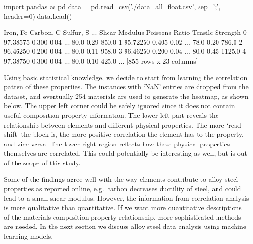 \documentclass[11pt]{article}
\newenvironment{Shaded}{}{}
\newcommand{\DecValTok}[1]{\textcolor[rgb]{0.25,0.63,0.44}{{#1}}}
\newcommand{\FloatTok}[1]{\textcolor[rgb]{0.25,0.63,0.44}{{#1}}}
\newcommand{\StringTok}[1]{\textcolor[rgb]{0.25,0.44,0.63}{{#1}}}
\newcommand{\NormalTok}[1]{{#1}}
\newcommand{\ImportTok}[1]{{#1}}
\newcommand{\OperatorTok}[1]{\textcolor[rgb]{0.40,0.40,0.40}{{#1}}}
\begin{document}
    \begin{Shaded}
\begin{Highlighting}[]
\ImportTok{import}\NormalTok{ pandas }\ImportTok{as}\NormalTok{ pd}
\NormalTok{data }\OperatorTok{=}\NormalTok{ pd.read_csv(}\StringTok{'./data_all_float.csv'}\NormalTok{, sep}\OperatorTok{=}\StringTok{';'}\NormalTok{, header}\OperatorTok{=}\DecValTok{0}\NormalTok{)}
\NormalTok{data.head()}

\NormalTok{   Iron, Fe  Carbon, C  Sulfur, S     ...     Shear Modulus  Poissons Ratio  Tensile Strength}
\DecValTok{0}  \FloatTok{97.38575}      \FloatTok{0.300}       \FloatTok{0.04}\NormalTok{     ...              }\FloatTok{80.0}            \FloatTok{0.29}           \FloatTok{850.0}          
\DecValTok{1}  \FloatTok{95.72250}      \FloatTok{0.405}       \FloatTok{0.02}\NormalTok{     ...              }\FloatTok{78.0}            \FloatTok{0.20}           \FloatTok{786.0}           
\DecValTok{2}  \FloatTok{96.46250}      \FloatTok{0.200}       \FloatTok{0.04}\NormalTok{     ...              }\FloatTok{80.0}            \FloatTok{0.11}           \FloatTok{958.0}           
\DecValTok{3}  \FloatTok{96.46250}      \FloatTok{0.200}       \FloatTok{0.04}\NormalTok{     ...              }\FloatTok{80.0}            \FloatTok{0.45}           \FloatTok{1125.0}         
\DecValTok{4}  \FloatTok{97.38750}      \FloatTok{0.300}       \FloatTok{0.04}\NormalTok{     ...              }\FloatTok{80.0}            \FloatTok{0.10}           \FloatTok{425.0}           
\NormalTok{...}
\NormalTok{[}\DecValTok{855}\NormalTok{ rows x }\DecValTok{23}\NormalTok{ columns]}
\end{Highlighting}
\end{Shaded}

    Using basic statistical knowledge, we decide to start from learning the
correlation patten of these properties. The instances with `NaN' entries
are dropped from the dataset, and eventually 254 materials are used to
generate the heatmap, as shown below. The upper left corner could be
safely ignored since it does not contain useful composition-property
information. The lower left part reveals the relationship between
elements and different physical properties. The more `read shift' the
block is, the more positive correlation the element has to the property,
and vice versa. The lower right region reflects how these physical
properties themselves are correlated. This could potentially be
interesting as well, but is out of the scope of this study.

Some of the findings agree well with the way elements contribute to
alloy steel properties as reported online, e.g.~carbon decreases
ductility of steel, and could lead to a small shear modulus. However,
the information from correlation analysis is more qualitative than
quantitative. If we want more quantitative descriptions of the materials
composition-property relationship, more sophisticated methods are
needed. In the next section we discuss alloy steel data analysis using
machine learning models.
\end{document}
